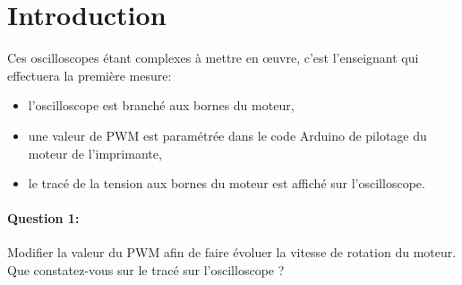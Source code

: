 

\section{Introduction}

Ces oscilloscopes étant complexes à mettre en \oe uvre, c'est l'enseignant qui effectuera la première mesure:
\begin{itemize}
 \item l'oscilloscope est branché aux bornes du moteur,
 \item une valeur de PWM est paramétrée dans le code Arduino de pilotage du moteur de l'imprimante,
 \item le tracé de la tension aux bornes du moteur est affiché sur l'oscilloscope.
\end{itemize}

\paragraph{Question 1:} Modifier la valeur du PWM afin de faire évoluer la vitesse de rotation du moteur. Que constatez-vous sur le tracé sur l'oscilloscope ?


